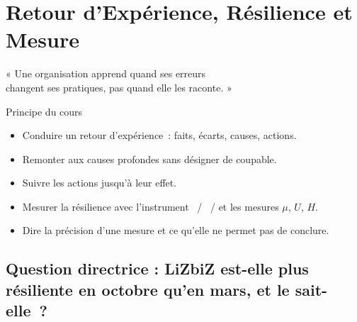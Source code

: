 
\chapter{Retour d'Expérience, Résilience et Mesure}
\label{chap:retex}

\epigraph{%
    « Une organisation apprend quand ses erreurs\\
    changent ses pratiques, pas quand elle les raconte. »%
}{Principe du cours}


\begin{boxobjectifs}
\begin{itemize}
    \item Conduire un retour d'expérience~: faits, écarts, causes, actions.
    \item Remonter aux causes profondes sans désigner de coupable.
    \item Suivre les actions jusqu'à leur effet.
    \item Mesurer la résilience avec l'instrument \OUI{}~/ \NON{}~/ \NEK{}
          et les mesures $\mu$, $U$, $H$.
    \item Dire la précision d'une mesure et ce qu'elle ne permet pas de
          conclure.
\end{itemize}
\end{boxobjectifs}

\bigskip

\section*{Question directrice : LiZbiZ est-elle plus résiliente en octobre qu'en mars, et le sait-elle~?}


